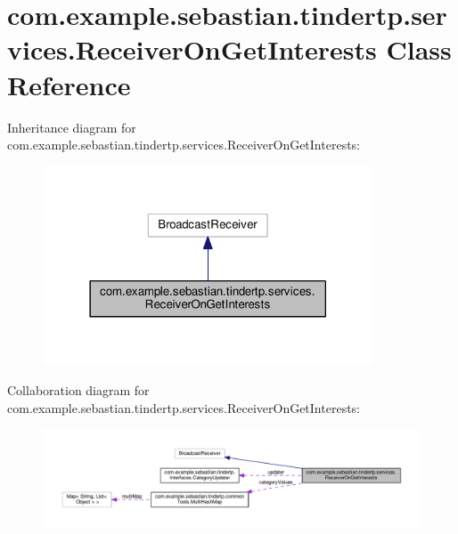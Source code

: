 \hypertarget{classcom_1_1example_1_1sebastian_1_1tindertp_1_1services_1_1ReceiverOnGetInterests}{}\section{com.\+example.\+sebastian.\+tindertp.\+services.\+Receiver\+On\+Get\+Interests Class Reference}
\label{classcom_1_1example_1_1sebastian_1_1tindertp_1_1services_1_1ReceiverOnGetInterests}


Inheritance diagram for com.\+example.\+sebastian.\+tindertp.\+services.\+Receiver\+On\+Get\+Interests\+:\nopagebreak
\begin{figure}[H]
\begin{center}
\leavevmode
\includegraphics[width=278pt]{classcom_1_1example_1_1sebastian_1_1tindertp_1_1services_1_1ReceiverOnGetInterests__inherit__graph}
\end{center}
\end{figure}


Collaboration diagram for com.\+example.\+sebastian.\+tindertp.\+services.\+Receiver\+On\+Get\+Interests\+:
\nopagebreak
\begin{figure}[H]
\begin{center}
\leavevmode
\includegraphics[width=350pt]{classcom_1_1example_1_1sebastian_1_1tindertp_1_1services_1_1ReceiverOnGetInterests__coll__graph}
\end{center}
\end{figure}
